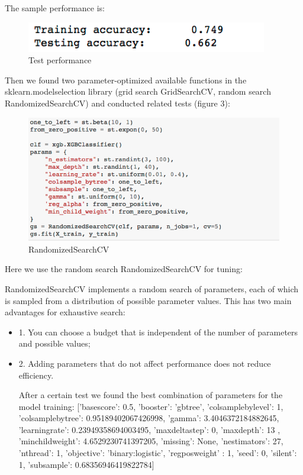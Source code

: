 \documentclass[fleqn,10pt]{wlscirep}
\newcommand{\li}{\uline{\hspace{0.5em}}}
\begin{document}
The sample performance is:
\begin{figure}[ht]
\centering
\includegraphics[width=\linewidth]{2.png}
\caption{Test performance }
\label{fig:2}
\end{figure}

Then we found two parameter-optimized available functions in the sklearn.model\li selection library (grid search GridSearchCV, random search RandomizedSearchCV) and conducted related tests (figure 3):
\begin{figure}[ht]
\centering
\includegraphics[width=\linewidth]{3.png}
\caption{RandomizedSearchCV}
\label{fig:3}
\end{figure}

Here we use the random search RandomizedSearchCV for tuning:

RandomizedSearchCV implements a random search of parameters, each of which is sampled from a distribution of possible parameter values. This has two main advantages for exhaustive search:
\begin{itemize}
\item 1. You can choose a budget that is independent of the number of parameters and possible values;
\item 2. Adding parameters that do not affect performance does not reduce efficiency.

After a certain test we found the best combination of parameters for the model training:
['base\li score': 0.5, 'booster': 'gbtree', 'colsample\li bylevel': 1, 'colsample\li bytree': 0.95189402067426998, 'gamma': 3.4046372184882645, 'learning\li rate': 0.23949358694003495, 'max\li delta\li step': 0, 'max\li depth': 13 , 'min\li child\li weight': 4.6529230741397205, 'missing': None, 'n\li estimators': 27, 'nthread': 1, 'objective': 'binary:logistic', 'reg\li pos\li weight' : 1, 'seed': 0, 'silent': 1, 'subsample': 0.68356946419822784]

\end{itemize}
\end{document}
